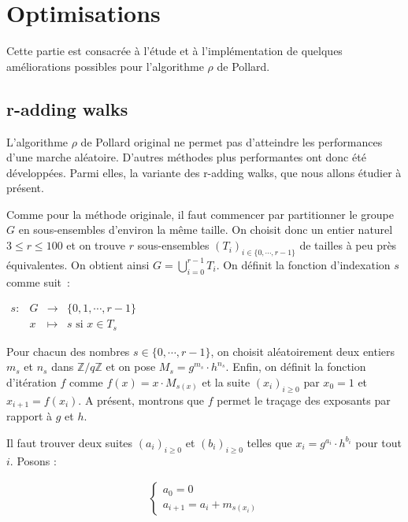 \chapter{Optimisations}
	Cette partie est consacrée à l'étude et à l'implémentation de quelques améliorations possibles pour l'algorithme $\rho$ de Pollard.

		\section{r-adding walks}
		L'algorithme $\rho$ de Pollard original ne permet pas d'atteindre les performances d'une marche aléatoire. D'autres méthodes plus performantes ont donc été développées. Parmi elles, la variante des r-adding walks, que nous allons étudier à présent.

		Comme pour la méthode originale, il faut commencer par partitionner le groupe $G$ en sous-ensembles d'environ la même taille. On choisit donc un entier naturel $3 \leq r \leq 100$ et on trouve $r$ sous-ensembles $(T_i)_{i \in \{0,\cdots,r-1\}}$ de tailles à peu près équivalentes. On obtient ainsi $G = \bigcup\limits_{i=0}^{r-1} T_i$. On définit la fonction d'indexation $s$ comme suit~:

		\begin{center}

		$\begin{array}{lrcl}
		s : & G & \longrightarrow & \{0,1,\cdots,r-1\} \\
		    & x & \longmapsto & s \text{ si } x \in T_s
		\end{array}$

		\end{center}

		Pour chacun des nombres $s \in \{0,\cdots,r-1\}$, on choisit aléatoirement deux entiers $m_s$ et $n_s$ dans $\mathbb{Z}/q\mathbb{Z}$ et on pose $M_s = g^{m_s} \cdot h^{n_s}$. Enfin, on définit la fonction d'itération $f$ comme $f(x) = x \cdot M_{s(x)}$ et la suite $(x_i)_{i \ge 0}$ par $x_0 = 1$ et $x_{i+1} = f(x_i)$. A présent, montrons que $f$ permet le traçage des exposants par rapport à $g$ et $h$.

		Il faut trouver deux suites $(a_i)_{i \ge 0}$ et $(b_i)_{i \ge 0}$ telles que $x_i = g^{a_i} \cdot h^{b_i}$ pour tout $i$. Posons :

		\begin{align*}
      \begin{cases}
        a_0 = 0 \\
        a_{i+1} = a_i + m_{s(x_i)}
      \end{cases}
    \end{align*}

